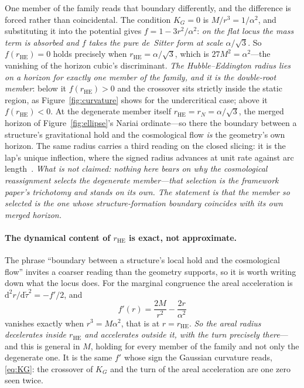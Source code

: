 \documentclass[11pt,a4paper]{article}
\theoremstyle{definition}
\newcommand{\dd}{\mathrm{d}}   %
\begin{document}
One member of the family reads that boundary differently, and the difference is forced rather than coincidental. The condition $K_{G}=0$ is $M/r^{3}=1/\alpha^{2}$, and substituting it into the potential gives $f=1-3r^{2}/\alpha^{2}$: \emph{on the flat locus the mass term is absorbed and $f$ takes the pure de~Sitter form at scale $\alpha/\sqrt3$}. So $f(r_{\mathrm{HE}})=0$ holds precisely when $r_{\mathrm{HE}}=\alpha/\sqrt3$, which is $27M^{2}=\alpha^{2}$---the vanishing of the horizon cubic's discriminant. \emph{The Hubble--Eddington radius lies on a horizon for exactly one member of the family, and it is the double-root member}: below it $f(r_{\mathrm{HE}})>0$ and the crossover sits strictly inside the static region, as Figure~\ref{fig:curvature} shows for the undercritical case; above it $f(r_{\mathrm{HE}})<0$. At the degenerate member itself $r_{\mathrm{HE}}=r_{N}=\alpha/\sqrt3$, the merged horizon of Figure~\ref{fig:ellipse}'s Nariai ordinate---so there the boundary between a structure's gravitational hold and the cosmological flow \emph{is} the geometry's own horizon. The same radius carries a third reading on the closed slicing: it is the lap's unique inflection, where the signed radius advances at unit rate against arc length~\cite{JanzenCRframework}. \emph{What is not claimed: nothing here bears on \emph{why} the cosmological reassignment selects the degenerate member---that selection is the framework paper's trichotomy and stands on its own. The statement is that the member so selected is the one whose structure-formation boundary coincides with its own merged horizon.}

\paragraph{The dynamical content of $r_{\mathrm{HE}}$ is exact, not approximate.} The phrase ``boundary between a structure's local hold and the cosmological flow'' invites a coarser reading than the geometry supports, so it is worth writing down what the locus does. For the marginal congruence the areal acceleration is $\dd^{2}r/\dd\tilde\tau^{2}=-f'/2$, and
\begin{equation}\label{eq:fprime-zero}
  f'(r)=\frac{2M}{r^{2}}-\frac{2r}{\alpha^{2}}
\end{equation}
vanishes exactly when $r^{3}=M\alpha^{2}$, that is at $r=r_{\mathrm{HE}}$. \emph{So the areal radius decelerates inside $r_{\mathrm{HE}}$ and accelerates outside it, with the turn precisely there}---and this is general in $M$, holding for every member of the family and not only the degenerate one. It is the same $f'$ whose sign the Gaussian curvature reads, \eqref{eq:KG}: the crossover of $K_{G}$ and the turn of the areal acceleration are one zero seen twice.
\end{document}
